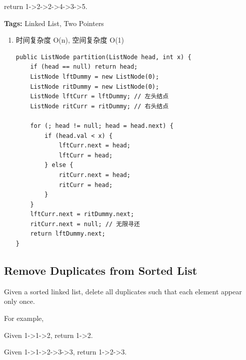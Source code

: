 \documentclass[12pt]{book}
\begin{document}
return 1->2->2->4->3->5.

\textbf{Tags:} Linked List, Two Pointers

\begin{enumerate}
\item 时间复杂度 O(n), 空间复杂度 O(1)
\label{sec-3-2-3-1}

\lstset{language=java,label= ,caption= ,numbers=none}
\begin{lstlisting}
public ListNode partition(ListNode head, int x) {
    if (head == null) return head;
    ListNode lftDummy = new ListNode(0);
    ListNode ritDummy = new ListNode(0);
    ListNode lftCurr = lftDummy; // 左头结点
    ListNode ritCurr = ritDummy; // 右头结点
        
    for (; head != null; head = head.next) {
        if (head.val < x) {
            lftCurr.next = head;
            lftCurr = head;
        } else {
            ritCurr.next = head;
            ritCurr = head;
        }
    }
    lftCurr.next = ritDummy.next;
    ritCurr.next = null; // 无限寻还
    return lftDummy.next;
}
\end{lstlisting}
\end{enumerate}

\subsection{Remove Duplicates from Sorted List}
\label{sec-3-2-4}
Given a sorted linked list, delete all duplicates such that each element appear only once.

For example,

Given 1->1->2, return 1->2.

Given 1->1->2->3->3, return 1->2->3.
\end{document}
